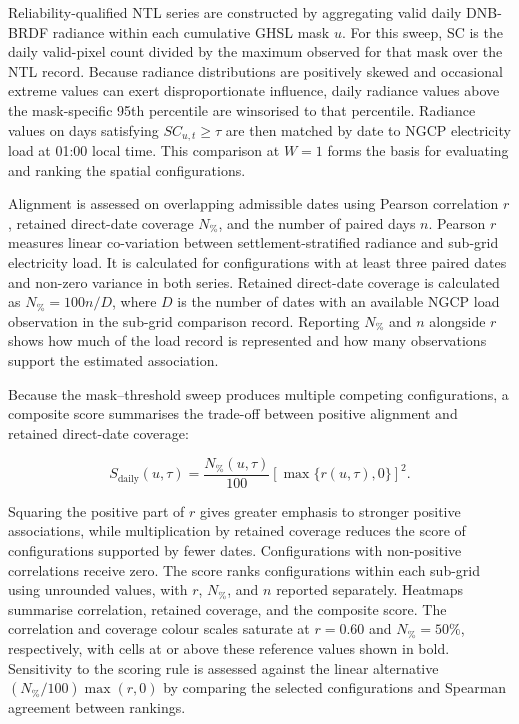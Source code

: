 \documentclass[]{interact}
\theoremstyle{plain}%
\theoremstyle{definition}
\theoremstyle{remark}
\begin{document}
        Reliability-qualified NTL series are constructed by aggregating valid daily DNB-BRDF radiance within each cumulative GHSL mask $u$. For this sweep, SC is the daily valid-pixel count divided by the maximum observed for that mask over the NTL record. Because radiance distributions are positively skewed and occasional extreme values can exert disproportionate influence, daily radiance values above the mask-specific 95th percentile are winsorised to that percentile. Radiance values on days satisfying $SC_{u,t}\geq\tau$ are then matched by date to NGCP electricity load at 01:00 local time. This comparison at $W=1$ forms the basis for evaluating and ranking the spatial configurations.
        
        Alignment is assessed on overlapping admissible dates using Pearson correlation $r$, retained direct-date coverage $N_{\%}$, and the number of paired days $n$. Pearson $r$ measures linear co-variation between settlement-stratified radiance and sub-grid electricity load. It is calculated for configurations with at least three paired dates and non-zero variance in both series. Retained direct-date coverage is calculated as $N_{\%}=100n/D$, where $D$ is the number of dates with an available NGCP load observation in the sub-grid comparison record. Reporting $N_{\%}$ and $n$ alongside $r$ shows how much of the load record is represented and how many observations support the estimated association.
        
        Because the mask--threshold sweep produces multiple competing configurations, a composite score summarises the trade-off between positive alignment and retained direct-date coverage:
        
        \begin{equation}
        S_{\mathrm{daily}}(u,\tau) =
        \frac{N_{\%}(u,\tau)}{100}
        \left[\max\{r(u,\tau),0\}\right]^2.
        \label{eq:composite_score}
        \end{equation}
        
        Squaring the positive part of $r$ gives greater emphasis to stronger positive associations, while multiplication by retained coverage reduces the score of configurations supported by fewer dates. Configurations with non-positive correlations receive zero. The score ranks configurations within each sub-grid using unrounded values, with $r$, $N_{\%}$, and $n$ reported separately. Heatmaps summarise correlation, retained coverage, and the composite score. The correlation and coverage colour scales saturate at $r=0.60$ and $N_{\%}=50\%$, respectively, with cells at or above these reference values shown in bold. Sensitivity to the scoring rule is assessed against the linear alternative $(N_{\%}/100)\max(r,0)$ by comparing the selected configurations and Spearman agreement between rankings.
        
\end{document}
